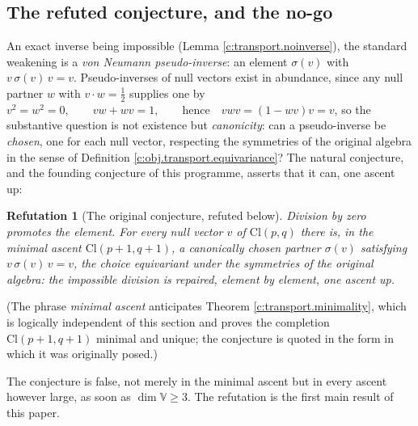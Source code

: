 \documentclass[11pt]{article}
\newtheorem{refutation}[theorem]{Refutation}
\theoremstyle{definition}
\theoremstyle{plain}
\providecommand{\Cl}{}\renewcommand{\Cl}{\mathrm{Cl}}
\begin{document}
\subsection*{The refuted conjecture, and the no-go}
\label{c:note.transport.setting-refuted-conjecture-no-go}
An exact inverse being impossible (Lemma \ref{c:transport.noinverse}), the standard weakening is a \emph{von Neumann pseudo-inverse}: an element $\sigma(v)$ with $v\,\sigma(v)\,v = v$. Pseudo-inverses of null vectors exist in abundance, since any null partner $w$ with $v \cdot w = \tfrac12$ supplies one by $v^2 = w^2 = 0, \qquad vw + wv = 1, \qquad \text{hence} \quad vwv = (1 - wv)v = v$, so the substantive question is not existence but \emph{canonicity}: can a pseudo-inverse be \emph{chosen}, one for each null vector, respecting the symmetries of the original algebra in the sense of Definition \ref{c:obj.transport.equivariance}? The natural conjecture, and the founding conjecture of this programme, asserts that it can, one ascent up:

\begin{refutation}[The original conjecture, refuted below]\label{c:transport.original-conjecture-refuted-below}
Division by zero promotes the element. For every null vector $v$ of $\Cl(p,q)$ there is, in the minimal ascent $\Cl(p{+}1,q{+}1)$, a canonically chosen partner $\sigma(v)$ satisfying $v\,\sigma(v)\,v = v$, the choice equivariant under the symmetries of the original algebra: the impossible division is repaired, element by element, one ascent up.
\end{refutation}

\label{c:note.transport.setting-refuted-conjecture-no-go-2}
(The phrase \emph{minimal ascent} anticipates Theorem \ref{c:transport.minimality}, which is logically independent of this section and proves the completion $\Cl(p{+}1,q{+}1)$ minimal and unique; the conjecture is quoted in the form in which it was originally posed.)

The conjecture is false, not merely in the minimal ascent but in every ascent however large, as soon as $\dim \mathbb{V} \geq 3$. The refutation is the first main result of this paper.
\end{document}
